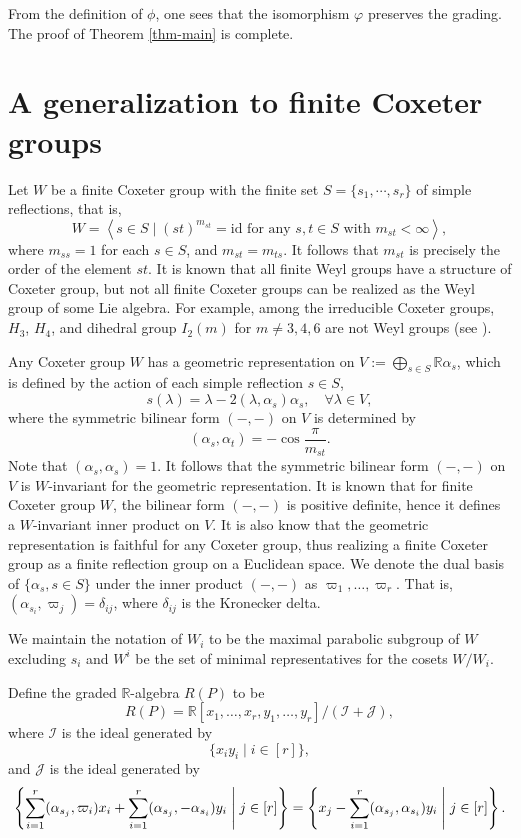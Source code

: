 \documentclass{amsart}
\theoremstyle{definition}
\theoremstyle{remark}
\numberwithin{equation}{section}
\begin{document}
From the definition of $\phi$, one sees that the isomorphism $\varphi$ preserves the grading.
The proof of Theorem \ref{thm-main} is complete.

\section{A generalization to finite Coxeter groups} \label{sec-gen}

Let $W$ be a finite Coxeter group with the finite set $S=\{s_1, \cdots, s_r\}$ of simple reflections, that is, 
\[W=\left\langle s \in S \mid (s t)^{m_{s t}}=\mathrm{id} \text { for any } s, t \in S \text { with } m_{s t}<\infty\right\rangle,\]
where $m_{s s}=1$ for each $s \in S$, and $m_{s t}=m_{t s}$. It follows that $m_{s t}$ is precisely the order of the element $s t$. It is known that all finite Weyl groups have a structure of Coxeter group, but not all finite Coxeter groups can be realized as the Weyl group of some Lie algebra. For example, among the irreducible Coxeter groups, $H_3$, $H_4$, and dihedral group $I_2(m)$ for $m \ne 3, 4, 6$ are not Weyl groups (see \cite{Humphreys90}).

Any Coxeter group $W$ has a geometric representation on $V:=\bigoplus_{s \in S}\mathbb{R}\alpha_s$, which is defined by the action of each simple reflection $s \in S$,
$$
s(\lambda)=\lambda-2\left(\lambda, \alpha_s\right) \alpha_s , \quad \forall \lambda \in V,
$$
where the symmetric bilinear form $(-,-)$ on $V$ is determined by
$$
\left(\alpha_s, \alpha_t\right)=-\cos \frac{\pi}{m_{s t}}.
$$
Note that $\left(\alpha_s, \alpha_s\right)=1$. It follows that the symmetric bilinear form $(-,-)$ on $V$ is $W$-invariant for the geometric representation. It is known that for finite Coxeter group $W$,  the bilinear form $(-,-)$ is positive definite, hence it defines a $W$-invariant inner product on $V$. It is also know that the geometric representation is faithful for any Coxeter group, thus realizing a finite Coxeter group as a finite reflection group on a Euclidean space. We denote the dual basis of $\{\alpha_s, s\in S\}$ under the inner product $(-,-)$ as $\varpi_1, \dots, \varpi_r$. That is, $(\alpha_{s_i}, \varpi_j)=\delta_{ij}$, where $\delta_{ij}$ is the Kronecker delta.

We maintain the notation of $W_i$ to be the maximal parabolic subgroup of $W$ excluding $s_i$ and $W^i$ be the set of minimal representatives for the cosets $W / W_i$. 

Define the graded $\mathbb{R}$-algebra $R\left(P\right)$ to be
    \begin{equation} \label{eq-def-R(P)}
     R\left(P\right)=\mathbb{R}\left[x_1, \ldots, x_r, y_1, \ldots, y_r\right] /\left(\mathcal{I}+\mathcal{J}\right),
    \end{equation}
    where $\mathcal{I}$ is the ideal generated by
    \[\{x_i y_i \mid i \in [r]\},\]
    and $\mathcal{J}$ is the ideal generated by 
    \[\left\{\sum_{i=1}^r(\alpha_{s_j},  \varpi_i)x_i+\sum_{i=1}^r(\alpha_{s_j}, -\alpha_{s_i} ) y_i \Biggm\vert j \in [r]\right\}=\left\{x_j-\sum_{i=1}^r(\alpha_{s_j}, \alpha_{s_i} ) y_i \Biggm\vert j \in [r]\right\}.\]
    
\end{document}
